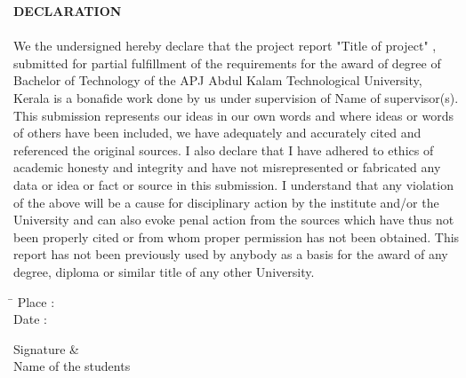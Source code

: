 \linespread{1}
\begin{center}
\textbf{\fontsize{16}{32}\selectfont DECLARATION}\\
\end{center}
\fontsize{12}{28}\selectfont
\paragraph*{}We the  undersigned hereby declare that the project report  "Title of project" , submitted for partial fulfillment of the requirements for the award of degree of Bachelor  of Technology of the APJ Abdul Kalam Technological University, Kerala is a bonafide work done by us  under supervision of  Name of supervisor(s). This submission represents our  ideas in our own   words and where ideas or words of others have been included, we  have adequately and accurately cited and referenced the original sources. I also declare that I have  adhered to ethics of academic honesty and integrity and have not misrepresented or fabricated any data or idea or fact or source in this  submission. I understand that any violation of the above will be a cause for disciplinary action by the institute and/or the University and can also evoke penal action from the sources which have thus not been properly cited or from whom proper permission has not been obtained. This report has not been previously used by anybody  as a  basis for the award of any degree, diploma or similar title of any other University.

\vspace{2em}


\begin{minipage}{.3\textwidth}
\begin{tabbing}
\hspace{1em}\=\kill
Place \> : %
 \\
Date \> :
\end{tabbing}
\end{minipage}
\hfill
\begin{minipage}[c]{.3\textwidth}
Signature \& \\ Name of the students
\end{minipage}

\thispagestyle{empty}
\clearpage